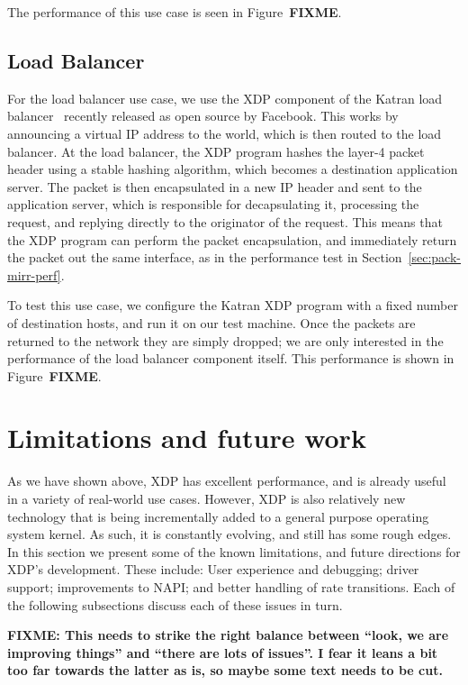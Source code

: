 \documentclass[10pt,sigconf]{acmart}
\begin{document}
The performance of this use case is seen in Figure~\textbf{FIXME}.

\subsection{Load Balancer}
\label{sec:load-balancer}
For the load balancer use case, we use the XDP component of the Katran load
balancer~\cite{katran} recently released as open source by Facebook. This works
by announcing a virtual IP address to the world, which is then routed to the
load balancer. At the load balancer, the XDP program hashes the layer-4 packet
header using a stable hashing algorithm, which becomes a destination application
server. The packet is then encapsulated in a new IP header and sent to the
application server, which is responsible for decapsulating it, processing the
request, and replying directly to the originator of the request. This means that
the XDP program can perform the packet encapsulation, and immediately return the
packet out the same interface, as in the performance test in
Section~\ref{sec:pack-mirr-perf}.

To test this use case, we configure the Katran XDP program with a fixed number
of destination hosts, and run it on our test machine. Once the packets are
returned to the network they are simply dropped; we are only interested in the
performance of the load balancer component itself. This performance is shown in
Figure~\textbf{FIXME}.

\section{Limitations and future work}
\label{sec:limitations}
As we have shown above, XDP has excellent performance, and is already useful in
a variety of real-world use cases. However, XDP is also relatively new
technology that is being incrementally added to a general purpose operating
system kernel. As such, it is constantly evolving, and still has some rough
edges. In this section we present some of the known limitations, and future
directions for XDP's development. These include: User experience and debugging;
driver support; improvements to NAPI; and better handling of rate transitions.
Each of the following subsections discuss each of these issues in turn.

\textbf{FIXME: This needs to strike the right balance between ``look, we are
  improving things'' and ``there are lots of issues''. I fear it leans a bit too
far towards the latter as is, so maybe some text needs to be cut.}
\end{document}
